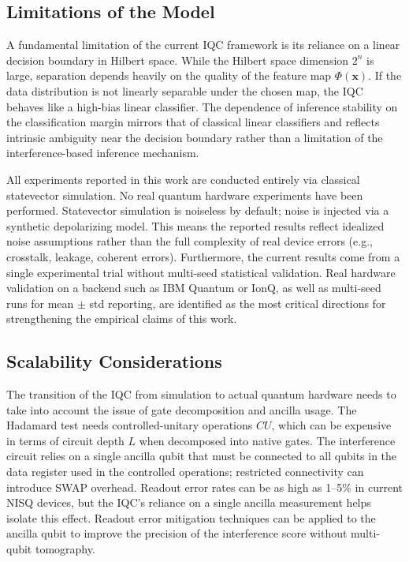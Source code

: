 \documentclass[conference]{IEEEtran}
\begin{document}
\subsection{Limitations of the Model}
A fundamental limitation of the current IQC framework is its reliance on a linear decision boundary in Hilbert space. While the Hilbert space dimension $2^n$ is large, separation depends heavily on the quality of the feature map $\Phi(\mathbf{x})$. If the data distribution is not linearly separable under the chosen map, the IQC behaves like a high-bias linear classifier. The dependence of inference stability on the classification margin mirrors that of classical linear classifiers and reflects intrinsic ambiguity near the decision boundary rather than a limitation of the interference-based inference mechanism.

All experiments reported in this work are conducted entirely via classical statevector simulation. No real quantum hardware experiments have been performed. Statevector simulation is noiseless by default; noise is injected via a synthetic depolarizing model. This means the reported results reflect idealized noise assumptions rather than the full complexity of real device errors (e.g., crosstalk, leakage, coherent errors). Furthermore, the current results come from a single experimental trial without multi-seed statistical validation. Real hardware validation on a backend such as IBM Quantum or IonQ, as well as multi-seed runs for mean $\pm$ std reporting, are identified as the most critical directions for strengthening the empirical claims of this work.

\subsection{Scalability Considerations}
The transition of the IQC from simulation to actual quantum hardware needs to take into account the issue of gate decomposition and ancilla usage. The Hadamard test needs controlled-unitary operations $CU$, which can be expensive in terms of circuit depth $L$ when decomposed into native gates. The interference circuit relies on a single ancilla qubit that must be connected to all qubits in the data register used in the controlled operations; restricted connectivity can introduce SWAP overhead. Readout error rates can be as high as 1--5\% in current NISQ devices, but the IQC's reliance on a single ancilla measurement helps isolate this effect. Readout error mitigation techniques can be applied to the ancilla qubit to improve the precision of the interference score without multi-qubit tomography.
\end{document}
